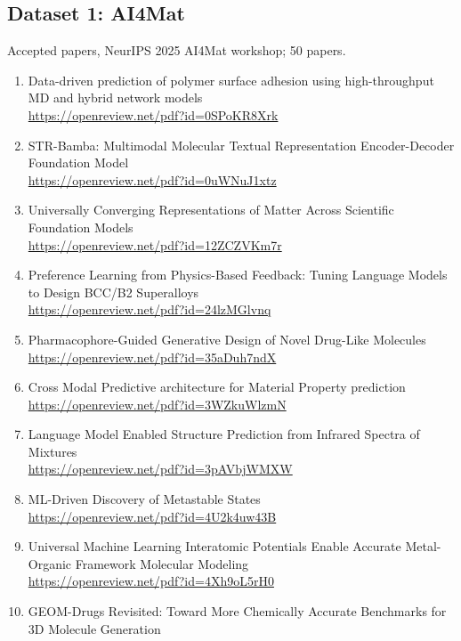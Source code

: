 \subsection{Dataset 1: AI4Mat}
\label{app:dataset-ai4mat}
Accepted papers, NeurIPS 2025 AI4Mat workshop; 50 papers.
\begin{enumerate}
  \item Data-driven prediction of polymer surface adhesion using high-throughput MD and hybrid network models\\
        \url{https://openreview.net/pdf?id=0SPoKR8Xrk}
  \item STR-Bamba: Multimodal Molecular Textual Representation Encoder-Decoder Foundation Model\\
        \url{https://openreview.net/pdf?id=0uWNuJ1xtz}
  \item Universally Converging Representations of Matter Across Scientific Foundation Models\\
        \url{https://openreview.net/pdf?id=12ZCZVKm7r}
  \item Preference Learning from Physics-Based Feedback: Tuning Language Models to Design BCC/B2 Superalloys\\
        \url{https://openreview.net/pdf?id=24lzMGlvnq}
  \item Pharmacophore-Guided Generative Design of Novel Drug-Like Molecules\\
        \url{https://openreview.net/pdf?id=35aDuh7ndX}
  \item Cross Modal Predictive architecture for Material Property prediction\\
        \url{https://openreview.net/pdf?id=3WZkuWlzmN}
  \item Language Model Enabled Structure Prediction from Infrared Spectra of Mixtures\\
        \url{https://openreview.net/pdf?id=3pAVbjWMXW}
  \item ML-Driven Discovery of Metastable States\\
        \url{https://openreview.net/pdf?id=4U2k4uw43B}
  \item Universal Machine Learning Interatomic Potentials Enable Accurate Metal-Organic Framework Molecular Modeling\\
        \url{https://openreview.net/pdf?id=4Xh9oL5rH0}
  \item GEOM-Drugs Revisited: Toward More Chemically Accurate Benchmarks for 3D Molecule Generation\\

\end{enumerate}

